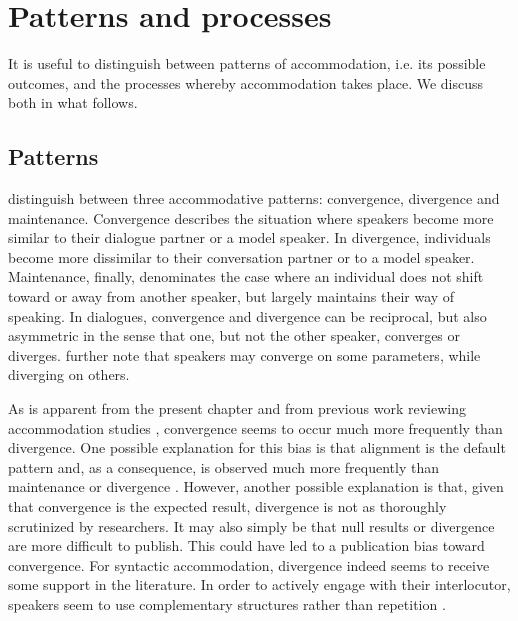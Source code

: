 \documentclass[output=paper]{langscibook}
\begin{document}
\section{Patterns and processes}

It is useful to distinguish between patterns of accommodation, i.e. its possible outcomes, and the processes whereby accommodation takes place. We discuss both in what follows.

\subsection{Patterns}

\textcite{giles_accommodation_1991} distinguish between three  accommodative patterns: convergence, divergence and maintenance. Convergence describes the situation where speakers become more similar to their dialogue partner or a model speaker. In divergence, individuals become more dissimilar to their conversation partner or to a model speaker. Maintenance, finally, denominates the case where an individual does not shift toward or away from another speaker, but largely maintains their way of speaking. In dialogues, convergence and divergence can be reciprocal, but also asymmetric in the sense that one, but not the other speaker, converges or diverges. \textcite{giles_accommodation_1991} further note that speakers may converge on some parameters, while diverging on others.

As is apparent from the present chapter and from previous work reviewing accommodation studies \citep{ruch_function_2018}, convergence seems to occur much more frequently than divergence. One possible explanation for this bias is that alignment is the default pattern and, as a consequence, is observed much more frequently than maintenance or divergence \citep[see][]{dijksterhuis_perception-behavior_2001}. However, another possible explanation is that, given that convergence is the expected result, divergence is not as thoroughly scrutinized by researchers. It may also simply be that null results or divergence are more difficult to publish. This could have led to a publication bias toward convergence. For syntactic accommodation, divergence indeed seems to receive some support in the literature. In order to actively engage with their interlocutor, speakers seem to use complementary structures rather than repetition \citep{healey_divergence_2014}.
\end{document}

